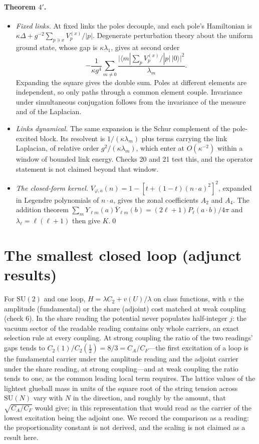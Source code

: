 \documentclass[11pt,a4paper]{article}
\theoremstyle{plain}
\theoremstyle{definition}
\theoremstyle{remark}
\newcommand{\SU}{\mathrm{SU}}
\begin{document}
\paragraph{Theorem $4'$.}
\begin{itemize}[leftmargin=2em, itemsep=3pt]
\item \emph{Fixed links.} At fixed links the poles decouple, and each pole's Hamiltonian is $\kappa\Delta+g^{-2}\sum_{p\ni x}V_p^{(x)}/|p|$. Degenerate perturbation theory about the uniform ground state, whose gap is $\kappa\lambda_1$, gives at second order
\[
-\frac{1}{\kappa g^4}\sum_{m\neq0}\frac{\big|\langle m|\sum_pV_p^{(x)}/|p|\,|0\rangle\big|^2}{\lambda_m}.
\]
Expanding the square gives the double sum. Poles at different elements are independent, so only paths through a common element couple. Invariance under simultaneous conjugation follows from the invariance of the measure and of the Laplacian.
\item \emph{Links dynamical.} The same expansion is the Schur complement of the pole-excited block. Its resolvent is $1/(\kappa\lambda_m)$ plus terms carrying the link Laplacian, of relative order $g^2/(\kappa\lambda_m)$, which enter at $O(\kappa^{-2})$ within a window of bounded link energy. Checks 20 and 21 test this, and the operator statement is not claimed beyond that window.
\item \emph{The closed-form kernel.} $V_{\varphi,a}(n)=1-[t+(1-t)(n\cdot a)^2]^2$, expanded in Legendre polynomials of $n\cdot a$, gives the zonal coefficients $A_2$ and $A_4$. The addition theorem $\sum_mY_{\ell m}(a)\bar Y_{\ell m}(b)=(2\ell+1)P_\ell(a\cdot b)/4\pi$ and $\lambda_\ell=\ell(\ell+1)$ then give $K$.\qed
\end{itemize}

\clearpage
\section{The smallest closed loop (adjunct results)}\label{app:loop}

For $\SU(2)$ and one loop, $H=\lambda C_2+v(U)/\lambda$ on class functions, with $v$ the amplitude (fundamental) or the share (adjoint) cost matched at weak coupling (check 6). In the share reading the potential never populates half-integer $j$: the vacuum sector of the readable reading contains only whole carriers, an exact selection rule at every coupling. At strong coupling the ratio of the two readings' gaps tends to $C_2(1)/C_2(\tfrac12)=8/3=C_A/C_F$---the first excitation of a loop is the fundamental carrier under the amplitude reading and the adjoint carrier under the share reading, at strong coupling---and at weak coupling the ratio tends to one, as the common leading local term requires. The lattice values of the lightest glueball mass in units of the square root of the string tension across $\SU(N)$ \cite{lt,teper} vary with $N$ in the direction, and roughly by the amount, that $\sqrt{C_A/C_F}$ would give; in this representation that would read as the carrier of the lowest excitation being the adjoint one. We record the comparison as a reading: the proportionality constant is not derived, and the scaling is not claimed as a result here.
\end{document}
